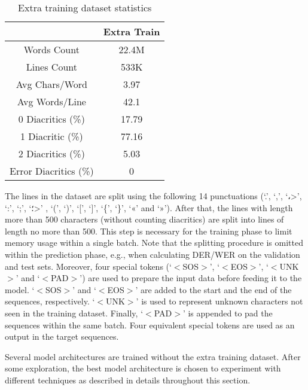 \documentclass[11pt,a4paper]{article}
\newcommand{\para}[1]{\medskip \noindent {\bf #1}}
\begin{document}
\begin{table}
\centering
\caption{Extra training dataset statistics}
\label{tab:extra_dataset}
\begin{tabular}{c|c|}
\cline{2-2}
                                            & Extra Train \\ \hline
\multicolumn{1}{|c|}{Words Count}           & 22.4M       \\ \hline
\multicolumn{1}{|c|}{Lines Count}           & 533K        \\ \hline
\multicolumn{1}{|c|}{Avg Chars/Word}        & 3.97        \\ \hline
\multicolumn{1}{|c|}{Avg Words/Line}        & 42.1        \\ \hline
\multicolumn{1}{|c|}{0 Diacritics (\%)}     & 17.79       \\ \hline
\multicolumn{1}{|c|}{1 Diacritic (\%)}      & 77.16       \\ \hline
\multicolumn{1}{|c|}{2 Diacritics (\%)}     & 5.03        \\ \hline
\multicolumn{1}{|c|}{Error Diacritics (\%)} & 0           \\ \hline
\end{tabular}
\end{table}

The lines in the dataset are split using the following 14 punctuations (`.', `,', 
`\<،>',
`:', `;', 
`\<؛>'
, `(', `)', `[', `]', `\{', `\}', `«' and `»'). After that, the lines with length more than 500 characters (without counting diacritics) are split into lines of length no more than 500. This step is necessary for the training phase to limit memory usage within a single batch. Note that the splitting procedure is omitted within the prediction phase, e.g., when calculating DER/WER on the validation and test sets. Moreover, four special tokens (`$<$SOS$>$', `$<$EOS$>$', `$<$UNK$>$' and `$<$PAD$>$') are used to prepare the input data before feeding it to the model. `$<$SOS$>$' and `$<$EOS$>$' are added to the start and the end of the sequences, respectively. `$<$UNK$>$' is used to represent unknown characters not seen in the training dataset. Finally, `$<$PAD$>$' is appended to pad the sequences within the same batch. Four equivalent special tokens are used as an output in the target sequences.

\para{Basic Model.}
Several model architectures are trained without the extra training dataset. After some exploration, the best model architecture is chosen to experiment with different techniques as described in details throughout this section.
\end{document}
